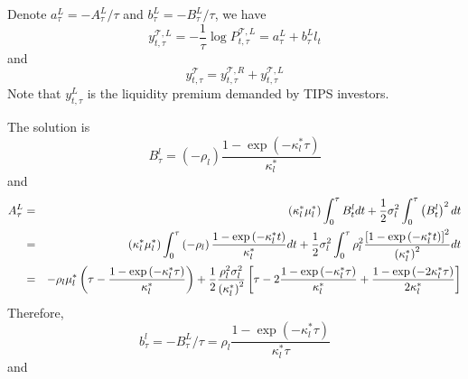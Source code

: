 \documentclass{article}
\begin{document}
Denote $a_{\tau }^{L}=-A_{\tau }^{L}/\tau $ and $b_{\tau }^{L}=-B_{\tau
}^{L}/\tau $, we have%
\begin{equation*}
y_{t,\tau }^{\mathcal{T},L}=-\frac{1}{\tau }\log P_{t,\tau }^{\mathcal{T}%
,L}=a_{\tau }^{L}+b_{\tau }^{L}l_{t}
\end{equation*}%
and%
\begin{equation*}
y_{t,\tau }^{\mathcal{T}}=y_{t,\tau }^{\mathcal{T},R}+y_{t,\tau }^{\mathcal{T%
},L}
\end{equation*}%
Note that $y_{t,\tau }^{L}$ is the liquidity premium demanded by TIPS
investors.

The solution is%
\begin{equation*}
B_{\tau }^{l}=\left( -\rho _{l}\right) \frac{1-\exp \left( -\kappa
_{l}^{\ast }\tau \right) }{\kappa _{l}^{\ast }}
\end{equation*}%
and%
\begin{eqnarray*}
A_{\tau }^{L} &=&\left( \kappa _{l}^{\ast }\mu _{l}^{\ast }\right)
\int_{0}^{\tau }B_{t}^{l}dt+\frac{1}{2}\sigma _{l}^{2}\int_{0}^{\tau }\left(
B_{t}^{l}\right) ^{2}dt \\
&=&\left( \kappa _{l}^{\ast }\mu _{l}^{\ast }\right) \int_{0}^{\tau }\left(
-\rho _{l}\right) \frac{1-\exp \left( -\kappa _{l}^{\ast }t\right) }{\kappa
_{l}^{\ast }}dt+\frac{1}{2}\sigma _{l}^{2}\int_{0}^{\tau }\rho _{l}^{2}\frac{%
\left[ 1-\exp \left( -\kappa _{l}^{\ast }t\right) \right] ^{2}}{\left(
\kappa _{l}^{\ast }\right) ^{2}}dt \\
&=&-\rho _{l}\mu _{l}^{\ast }\left( \tau -\frac{1-\exp \left( -\kappa
_{l}^{\ast }\tau \right) }{\kappa _{l}^{\ast }}\right) +\frac{1}{2}\frac{%
\rho _{l}^{2}\sigma _{l}^{2}}{\left( \kappa _{l}^{\ast }\right) ^{2}}\left[
\tau -2\frac{1-\exp \left( -\kappa _{l}^{\ast }\tau \right) }{\kappa
_{l}^{\ast }}+\frac{1-\exp \left( -2\kappa _{l}^{\ast }\tau \right) }{%
2\kappa _{l}^{\ast }}\right] 
\end{eqnarray*}%
Therefore,%
\begin{equation*}
b_{\tau }^{l}=-B_{\tau }^{L}/\tau =\rho _{l}\frac{1-\exp \left( -\kappa
_{l}^{\ast }\tau \right) }{\kappa _{l}^{\ast }\tau }
\end{equation*}%
and%
\end{document}
